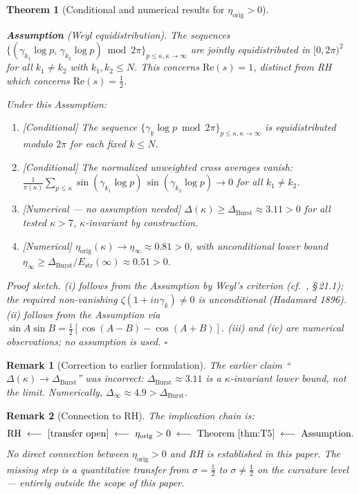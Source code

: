 \documentclass[11pt]{article}
\newtheorem{theorem}{Theorem}[section]
\newtheorem*{remark}{Remark}
\newcommand{\Estr}{E_{\mathrm{str}}}
\newcommand{\etaorig}{\eta_{\mathrm{orig}}}
\newcommand{\Dburstvar}{\Delta_{\mathrm{Burst}}}
\begin{document}
\begin{theorem}[Conditional and numerical results for $\etaorig > 0$]\label{thm:T5}

\textbf{Assumption} (Weyl equidistribution).
The sequences
$\{(\gamma_{k_1}\log p,\,\gamma_{k_2}\log p)\bmod 2\pi\}_{p\leq\kappa,
\kappa\to\infty}$
are jointly equidistributed in $[0,2\pi)^2$
for all $k_1\neq k_2$ with $k_1,k_2\leq N$.
This concerns $\mathrm{Re}(s)=1$, distinct from RH
which concerns $\mathrm{Re}(s)=\tfrac{1}{2}$.

Under this Assumption:

\begin{enumerate}[label=(\roman*)]
\item \emph{[Conditional]}
  The sequence $\{\gamma_k\log p\bmod 2\pi\}_{p\leq\kappa,\kappa\to\infty}$
  is equidistributed modulo $2\pi$ for each fixed $k\leq N$.
\item \emph{[Conditional]}
  The normalized unweighted cross averages vanish:
  $\frac{1}{\pi(\kappa)}\sum_{p\leq\kappa}
  \sin(\gamma_{k_1}\log p)\,\sin(\gamma_{k_2}\log p)\to 0$
  for all $k_1\neq k_2$.
\item \emph{[Numerical --- no assumption needed]}
  $\Delta(\kappa) \geq \Dburstvar \approx 3.11 > 0$ for all tested $\kappa > 7$,
  $\kappa$-invariant by construction.
\item \emph{[Numerical]}
  $\etaorig(\kappa)\to\eta_\infty \approx 0.81 > 0$,
  with unconditional lower bound
  $\eta_\infty\geq\Dburstvar/\Estr(\infty)\approx 0.51 > 0$.
\end{enumerate}

\emph{Proof sketch.}
(i) follows from the Assumption by Weyl's criterion
(cf.\ \cite{IwaniecKowalski}, \S\,21.1); the required
non-vanishing $\zeta(1+in\gamma_k)\neq 0$ is unconditional
(Hadamard 1896).
(ii) follows from the Assumption via
$\sin A\sin B = \tfrac{1}{2}[\cos(A-B)-\cos(A+B)]$.
(iii) and (iv) are numerical observations; no assumption is used.
$\square$
\end{theorem}

\begin{remark}[Correction to earlier formulation]
The earlier claim ``$\Delta(\kappa)\to\Dburstvar$'' was incorrect:
$\Dburstvar \approx 3.11$ is a $\kappa$-invariant lower bound,
not the limit. Numerically, $\Delta_\infty \approx 4.9 > \Dburstvar$.
\end{remark}

\begin{remark}[Connection to RH]
The implication chain is:
\[
\mathrm{RH}
\;\longleftarrow\;
[\text{transfer open}]
\;\longleftarrow\; \etaorig > 0
\;\longleftarrow\; \text{Theorem~\ref{thm:T5}}
\;\longleftarrow\; \text{Assumption}.
\]
No direct connection between $\etaorig > 0$ and RH is established
in this paper. The missing step is a quantitative transfer from
$\sigma=\tfrac{1}{2}$ to $\sigma\neq\tfrac{1}{2}$ on the curvature
level --- entirely outside the scope of this paper.
\end{remark}
\end{document}
